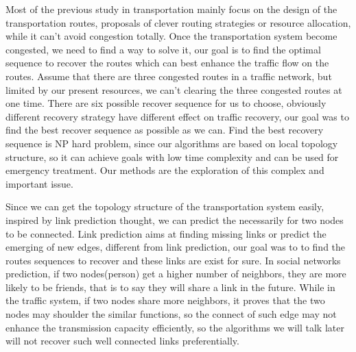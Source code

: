 \documentclass[onecolumn,preprintnumbers,amsmath,amssymb]{revtex4}
\begin{document}
Most of the previous study in transportation mainly focus on the design of the transportation routes, proposals of clever routing strategies or resource allocation, while it can't avoid congestion totally. Once the transportation system become congested, we need to find a way to solve it, our goal is to find the optimal sequence to recover the routes which can best enhance the traffic flow on the routes. Assume that there are three congested routes in a traffic network, but limited by our present resources, we can't clearing the three congested routes at one time. There are six possible recover sequence for us to choose, obviously different recovery strategy have different effect on traffic recovery, our goal was to find the best recover sequence as possible as we can. Find the best recovery sequence is NP hard problem, since our algorithms are based on local topology structure, so it can achieve goals with low time complexity and can be used for emergency treatment. Our methods are the exploration of this complex and important issue. 

Since we can get the topology structure of the transportation system easily, inspired by link prediction thought, we can predict the necessarily for two nodes to be connected. Link prediction aims at finding missing links or predict the emerging of new edges\cite{}, different from link prediction, our goal was to to find the routes sequences to recover and these links are exist for sure.  
In social networks prediction, if two nodes(person) get a higher number of neighbors, they are more likely to be friends, that is to say they will share a link in the future. While in the traffic system, if two nodes share more neighbors, it proves that the two nodes may shoulder the similar functions, so the connect of such edge may not enhance the transmission capacity efficiently, so the algorithms we will talk later will not recover such well connected links preferentially.  
\end{document}

